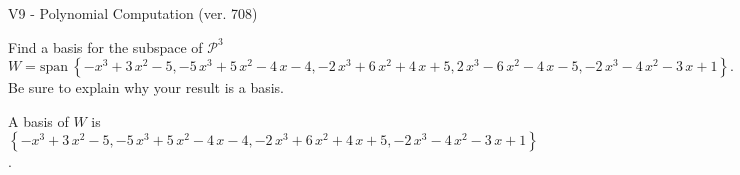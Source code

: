 \begin{exercise}
  \begin{exerciseTitle}V9 - Polynomial Computation (ver. 708)\end{exerciseTitle}
  \begin{exerciseStatement}
    Find a basis for the subspace of \(\mathcal{P}^3\) 
\[W=\mathrm{span}\ \left\{-x^{3} + 3 \, x^{2} - 5 , -5 \, x^{3} + 5 \, x^{2} - 4 \, x - 4 , -2 \, x^{3} + 6 \, x^{2} + 4 \, x + 5 , 2 \, x^{3} - 6 \, x^{2} - 4 \, x - 5 , -2 \, x^{3} - 4 \, x^{2} - 3 \, x + 1\right\}.\]
 Be sure to explain why your result is a basis.


  \end{exerciseStatement}
  \begin{exerciseAnswer}
   A basis of \(W\) is  \(\left\{-x^{3} + 3 \, x^{2} - 5 , -5 \, x^{3} + 5 \, x^{2} - 4 \, x - 4 , -2 \, x^{3} + 6 \, x^{2} + 4 \, x + 5 , -2 \, x^{3} - 4 \, x^{2} - 3 \, x + 1\right\}\).
  


  \end{exerciseAnswer}
\end{exercise}